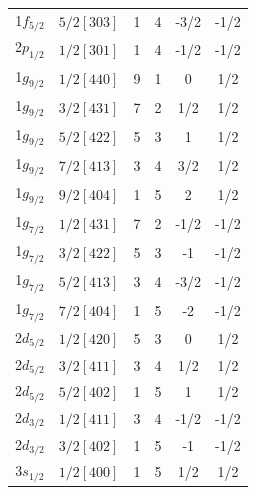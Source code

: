 \documentclass[10pt,a4paper, twoside]{report}
\begin{document}
\begin{table}[htbp]
\begin{tabular}{|c|c|c|c|c|c|}
1$f_{5/2}$ & $5/2[303]$            & 1          & 4             & -3/2      & -1/2         \\
2$p_{1/2}$ & $1/2[301]$            & 1          & 4             & -1/2      & -1/2         \\
\midrule
1$g_{9/2}$ & $1/2[440]$            & 9          & 1             & 0        & 1/2       \\
1$g_{9/2}$ & $3/2[431]$            & 7          & 2             & 1/2      & 1/2         \\
1$g_{9/2}$ & $5/2[422]$            & 5          & 3             & 1        & 1/2       \\
1$g_{9/2}$ & $7/2[413]$            & 3          & 4             & 3/2      & 1/2         \\
1$g_{9/2}$ & $9/2[404]$            & 1          & 5             & 2        & 1/2       \\
1$g_{7/2}$ & $1/2[431]$            & 7          & 2             & -1/2      & -1/2         \\
1$g_{7/2}$ & $3/2[422]$            & 5          & 3             & -1          & -1/2     \\
1$g_{7/2}$ & $5/2[413]$            & 3          & 4             & -3/2      & -1/2         \\ 
1$g_{7/2}$ & $7/2[404]$            & 1          & 5             & -2        & -1/2       \\
2$d_{5/2}$ & $1/2[420]$            & 5          & 3             & 0         & 1/2      \\
2$d_{5/2}$ & $3/2[411]$            & 3          & 4             & 1/2      & 1/2         \\
2$d_{5/2}$ & $5/2[402]$            & 1          & 5             & 1    & 1/2  \\
2$d_{3/2}$ & $1/2[411]$            & 3          & 4             & -1/2     & -1/2          \\
2$d_{3/2}$ & $3/2[402]$            & 1          & 5             & -1       & -1/2        \\
3$s_{1/2}$ & $1/2[400]$            & 1          & 5             & 1/2       & 1/2        \\
\bottomrule
\bottomrule
\end{tabular}
\end{table}
\end{document}
